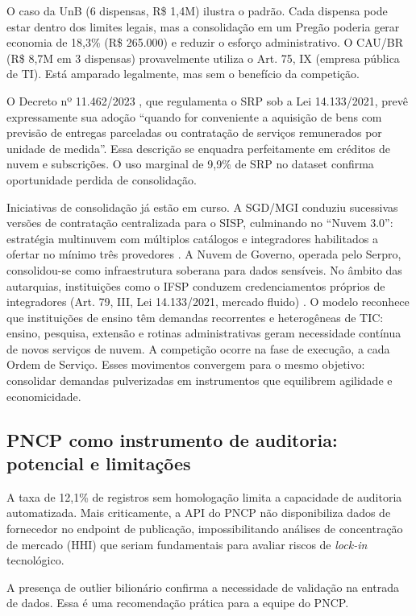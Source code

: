 \documentclass[12pt]{article}
\begin{document}
O caso da UnB (6 dispensas, R\$ 1,4M) ilustra o padrão. Cada dispensa pode estar dentro dos limites legais, mas a consolidação em um Pregão poderia gerar economia de 18,3\% (R\$ 265.000) e reduzir o esforço administrativo. O CAU/BR (R\$ 8,7M em 3 dispensas) provavelmente utiliza o Art. 75, IX (empresa pública de TI). Está amparado legalmente, mas sem o benefício da competição.

O Decreto nº 11.462/2023 \cite{brasil2022decreto11462}, que regulamenta o SRP sob a Lei 14.133/2021, prevê expressamente sua adoção ``quando for conveniente a aquisição de bens com previsão de entregas parceladas ou contratação de serviços remunerados por unidade de medida''. Essa descrição se enquadra perfeitamente em créditos de nuvem e subscrições. O uso marginal de 9,9\% de SRP no dataset confirma oportunidade perdida de consolidação.

Iniciativas de consolidação já estão em curso. A SGD/MGI conduziu sucessivas versões de contratação centralizada para o SISP, culminando no ``Nuvem 3.0'': estratégia multinuvem com múltiplos catálogos e integradores habilitados a ofertar no mínimo três provedores \cite{sgd2024etp_nuvem3, brasil2023portaria5950}. A Nuvem de Governo, operada pelo Serpro, consolidou-se como infraestrutura soberana para dados sensíveis. No âmbito das autarquias, instituições como o IFSP conduzem credenciamentos próprios de integradores (Art. 79, III, Lei 14.133/2021, mercado fluido) \cite{ifsp2026credenciamento}. O modelo reconhece que instituições de ensino têm demandas recorrentes e heterogêneas de TIC: ensino, pesquisa, extensão e rotinas administrativas geram necessidade contínua de novos serviços de nuvem. A competição ocorre na fase de execução, a cada Ordem de Serviço. Esses movimentos convergem para o mesmo objetivo: consolidar demandas pulverizadas em instrumentos que equilibrem agilidade e economicidade.

\subsection{PNCP como instrumento de auditoria: potencial e limitações}

A taxa de 12,1\% de registros sem homologação limita a capacidade de auditoria automatizada. Mais criticamente, a API do PNCP não disponibiliza dados de fornecedor no endpoint de publicação, impossibilitando análises de concentração de mercado (HHI) que seriam fundamentais para avaliar riscos de \textit{lock-in} tecnológico.

A presença de outlier bilionário confirma a necessidade de validação na entrada de dados. Essa é uma recomendação prática para a equipe do PNCP.
\end{document}
